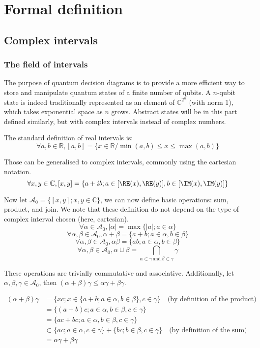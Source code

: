 \chapter{Formal definition}

\section{Complex intervals}

\subsection{The field of intervals}


The purpose of quantum decision diagrams is to provide a more efficient way to store and manipulate quantum states of a finite number of qubits. A $n$-qubit state is indeed traditionally represented as an element of $\mathbb{C}^{2^n}$ (with norm 1), which takes exponential space as $n$ grows. Abstract states will be in this part defined similarly, but with complex intervals instead of complex numbers.

The standard definition of real intervals is:
$$\forall a, b \in \mathbb{R}, [a, b]
= \{x \in \mathbb{R} / \min(a, b) \le x \le \max(a, b)\}$$

Those can be generalised to complex intervals, commonly using the cartesian notation.
$$\forall x, y \in \mathbb{C}, [x, y]
= \{a + ib ; a \in [\RE(x), \RE(y)], b \in [\IM(x), \IM(y)]\}$$

Now let $\mathcal{A}_0 = \{[x, y] ; x, y \in \mathbb{C}\}$, we can now define basic operations: sum, product, and join. We note that these definition do not depend on the type of complex interval chosen (here, cartesian).
$$\forall \alpha \in \mathcal{A}_0, |\alpha| = \max\{|a| ; a \in \alpha\}$$
$$\forall \alpha, \beta \in \mathcal{A}_0, \alpha + \beta = \{a + b ; a \in \alpha, b \in \beta\}$$
$$\forall \alpha, \beta \in \mathcal{A}_0, \alpha \beta = \{ab ; a \in \alpha, b \in \beta\}$$
$$\forall \alpha, \beta \in \mathcal{A}_0, \alpha \sqcup \beta = \bigcap_{\alpha \subset \gamma~\text{and}~\beta \subset \gamma} \gamma$$

\noindent These operations are trivially commutative and associative. Additionally, let $\alpha, \beta, \gamma \in \mathcal{A}_0$, then $(\alpha + \beta) \gamma \le \alpha \gamma + \beta \gamma$.

\noindent {}
\begin{align*}
(\alpha + \beta)\gamma &= \{xc ; x \in \{a + b ; a \in \alpha, b \in \beta\}, c \in \gamma\} \quad \text{(by definition of the product)}\\
&= \{(a + b)c ; a \in \alpha, b \in \beta, c \in \gamma\} \\
&= \{ac + bc ; a \in \alpha, b \in \beta, c \in \gamma\} \\
&\subset \{ac; a \in \alpha, c \in \gamma\} + \{bc ; b \in \beta, c \in \gamma\} \quad \text{(by definition of the sum)} \\
&= \alpha \gamma + \beta \gamma
\end{align*}
\hfill{} $\boxed{}$

